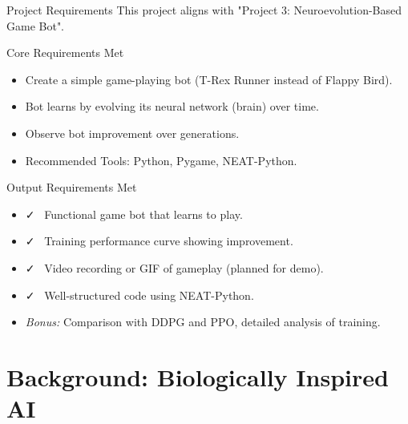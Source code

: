 \documentclass{beamer}
\begin{document}
\begin{frame}{Project Requirements}
  This project aligns with "Project 3: Neuroevolution-Based Game Bot".
  \begin{block}{Core Requirements Met}
    \begin{itemize}
      \item Create a simple game-playing bot (T-Rex Runner instead of Flappy Bird).
      \item Bot learns by evolving its neural network (brain) over time.
      \item Observe bot improvement over generations.
      \item Recommended Tools: Python, Pygame, NEAT-Python.
    \end{itemize}
  \end{block}
  \begin{block}{Output Requirements Met}
    \begin{itemize}
      \item \faCheck~ Functional game bot that learns to play.
      \item \faCheck~ Training performance curve showing improvement.
      \item \faCheck~ Video recording or GIF of gameplay (planned for demo).
      \item \faCheck~ Well-structured code using NEAT-Python.
      \item \textit{Bonus:} Comparison with DDPG and PPO, detailed analysis of training.
    \end{itemize}
  \end{block}
\end{frame}

\section{Background: Biologically Inspired AI}
\end{document}
